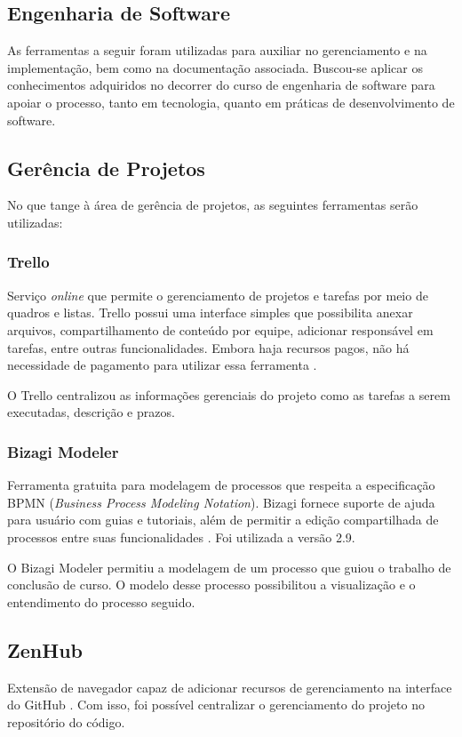 \begin{apendicesenv}
\section{Engenharia de Software}
As ferramentas a seguir foram utilizadas para auxiliar no gerenciamento e na implementação, bem como na documentação associada. Buscou-se aplicar os conhecimentos adquiridos no decorrer do curso de engenharia de software para apoiar o processo, tanto em tecnologia, quanto em práticas de desenvolvimento de software.

\subsection{Gerência de Projetos}
No que tange à área de gerência de projetos, as seguintes ferramentas serão utilizadas:

\subsubsection{Trello} 
Serviço \textit{online} que permite o gerenciamento de projetos e tarefas por meio de quadros e listas. Trello possui uma interface simples que possibilita anexar arquivos, compartilhamento de conteúdo por equipe, adicionar responsável em tarefas,  entre outras funcionalidades. Embora haja recursos pagos, não há necessidade de pagamento para utilizar essa ferramenta \cite{trello2015}.
\par
\indent O Trello centralizou as informações gerenciais do projeto como as tarefas a serem executadas, descrição e prazos. 

\subsubsection{Bizagi Modeler}
Ferramenta gratuita para modelagem de processos que respeita a especificação BPMN (\textit{Business Process Modeling Notation}). Bizagi fornece suporte de ajuda para usuário com guias e tutoriais, além de permitir a edição compartilhada de processos entre suas funcionalidades \cite{bizagi2015}. Foi utilizada a versão 2.9.
\par
\indent O Bizagi Modeler permitiu a modelagem de um processo que guiou o trabalho de conclusão de curso. O modelo desse processo possibilitou a visualização e o entendimento do processo seguido.

\subsection{ZenHub}
Extensão de navegador capaz de adicionar recursos de gerenciamento na interface do GitHub \cite{zenhub}. Com isso, foi possível centralizar o gerenciamento do projeto no repositório do código.




\end{apendicesenv}
